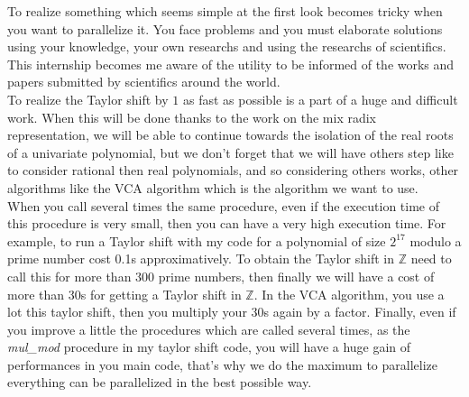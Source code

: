 To realize something which seems simple at the first look becomes tricky when you want to parallelize it. You face problems and you must elaborate solutions using your knowledge, your own researchs and using the researchs of scientifics. This internship becomes me aware of the utility to be informed of the works and papers submitted by scientifics around the world. \\

To realize the Taylor shift by $1$ as fast as possible is a part of a huge and difficult work. When this will be done thanks to the work on the mix radix representation, we will be able to continue towards the isolation of the real roots of a univariate polynomial, but we don't forget that we will have others step like to consider rational then real polynomials, and so considering others works, other algorithms like the VCA algorithm which is the algorithm we want to use. \\

When you call several times the same procedure, even if the execution time of this procedure is very small, then you can have a very high execution time. For example, to run a Taylor shift with my code for a polynomial of size $2^{17}$ modulo a prime number cost 0.1s approximatively. To obtain the Taylor shift in $\mathbb{Z}$ need to call this for more than $300$ prime numbers, then finally we will have a cost of more than 30s for getting a Taylor shift in $\mathbb{Z}$. In the VCA algorithm, you use a lot this taylor shift, then you multiply your 30s again by a factor. Finally, even if you improve a little the procedures which are called several times, as the \textit{mul\_mod} procedure in my taylor shift code, you will have a huge gain of performances in you main code, that's why we do the maximum to parallelize everything can be parallelized in the best possible way.
